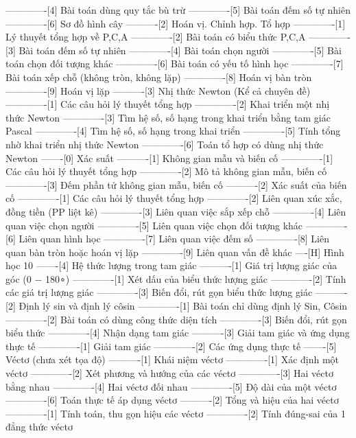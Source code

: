 -------------[4] Bài toán dùng quy tắc bù trừ
-------------[5] Bài toán đếm số tự nhiên
-------------[6] Sơ đồ hình cây
----------[2] Hoán vị. Chỉnh hợp. Tổ hợp
-------------[1] Lý thuyết tổng hợp về P,C,A
-------------[2] Bài toán có biểu thức P,C,A
-------------[3] Bài toán đếm số tự nhiên
-------------[4] Bài toán chọn người
-------------[5] Bài toán chọn đối tượng khác
-------------[6] Bài toán có yếu tố hình học
-------------[7] Bài toán xếp chỗ (không tròn, không lặp)
-------------[8] Hoán vị bàn tròn
-------------[9] Hoán vị lặp
----------[3] Nhị thức Newton (Kể cả chuyên đề)
-------------[1] Các câu hỏi lý thuyết tổng hợp
-------------[2] Khai triển một nhị thức Newton
-------------[3] Tìm hệ số, số hạng trong khai triển bằng tam giác Pascal
-------------[4] Tìm hệ số, số hạng trong khai triển
-------------[5] Tính tổng nhờ khai triển nhị thức Newton
-------------[6] Toán tổ hợp có dùng nhị thức Newton
-------[0] Xác suất
----------[1] Không gian mẫu và biến cố
-------------[1] Các câu hỏi lý thuyết tổng hợp
-------------[2] Mô tả không gian mẫu, biến cố
-------------[3] Đếm phần tử không gian mẫu, biến cố
----------[2] Xác suất của biến cố
-------------[1] Các câu hỏi lý thuyết tổng hợp
-------------[2] Liên quan xúc xắc, đồng tiền (PP liệt kê)
-------------[3] Liên quan việc sắp xếp chỗ
-------------[4] Liên quan việc chọn người
-------------[5] Liên quan việc chọn đối tượng khác
-------------[6] Liên quan hình học
-------------[7] Liên quan việc đếm số
-------------[8] Liên quan bàn tròn hoặc hoán vị lặp 
-------------[9] Liên quan vấn đề khác
----[H] Hình học 10
-------[4] Hệ thức lượng trong tam giác
----------[1] Giá trị lượng giác của góc (0 − 180∘)
-------------[1] Xét dấu của biểu thức lượng giác
-------------[2] Tính các giá trị lượng giác
-------------[3] Biến đổi, rút gọn biểu thức lượng giác
----------[2] Định lý sin và định lý côsin
-------------[1] Bài toán chỉ dùng định lý Sin, Côsin
-------------[2] Bài toán có dùng công thức diện tích
-------------[3] Biến đổi, rút gọn biểu thức
-------------[4] Nhận dạng tam giác
----------[3] Giải tam giác và ứng dụng thực tế
-------------[1] Giải tam giác
-------------[2] Các ứng dụng thực tế
-------[5] Véctơ (chưa xét tọa độ)
----------[1] Khái niệm véctơ
-------------[1] Xác định một véctơ
-------------[2] Xét phương và hướng của các véctơ
-------------[3] Hai véctơ bằng nhau
-------------[4] Hai véctơ đối nhau
-------------[5] Độ dài của một véctơ
-------------[6] Toán thực tế áp dụng véctơ
----------[2] Tổng và hiệu của hai véctơ
-------------[1] Tính toán, thu gọn hiệu các véctơ
-------------[2] Tính đúng-sai của 1 đẳng thức véctơ
